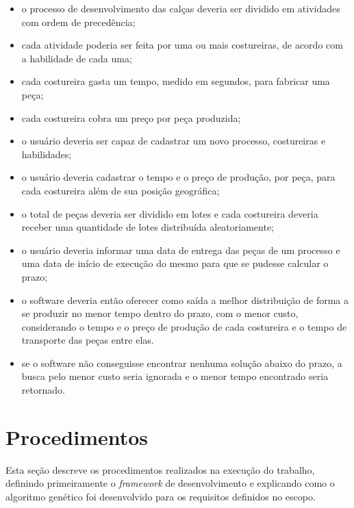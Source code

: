 \begin{itemize}
	
	\item o processo de desenvolvimento das calças deveria ser dividido em
	atividades com ordem de precedência;
	
	\item cada atividade poderia ser feita por uma ou mais costureiras, de acordo
	com a habilidade de cada uma;
	
	\item cada costureira gasta um tempo, medido em segundos, para fabricar uma
	peça;
	
	\item cada costureira cobra um preço por peça produzida;
	
	\item o usuário deveria ser capaz de cadastrar um novo processo, costureiras e
	habilidades;
	
	\item o usuário deveria cadastrar o tempo e o preço de produção, por peça, para
	cada costureira além de sua posição geográfica; 
	
	\item o total de peças deveria ser dividido em lotes e cada costureira deveria
	receber uma quantidade de lotes distribuída aleatoriamente;
	
	\item o usuário deveria informar uma data de entrega das peças de um processo e
	uma data de início de execução do mesmo para que se pudesse calcular o prazo;
	
	\item o software deveria então oferecer como saída a melhor distribuição de
	forma a se produzir no menor tempo dentro do prazo, com o menor custo, considerando 
	o tempo e o preço de produção de cada costureira e o tempo de transporte das peças 
	entre elas.
	
	\item se o software não conseguisse encontrar nenhuma solução abaixo do prazo, a
	busca pelo menor custo seria ignorada e o menor tempo encontrado seria retornado.
	
\end{itemize}

\section{Procedimentos}

\par Esta seção descreve os procedimentos realizados na execução do trabalho,
definindo primeiramente o \textit{framework} de desenvolvimento e explicando
como o algoritmo genético foi desenvolvido para os requisitos definidos no escopo.


